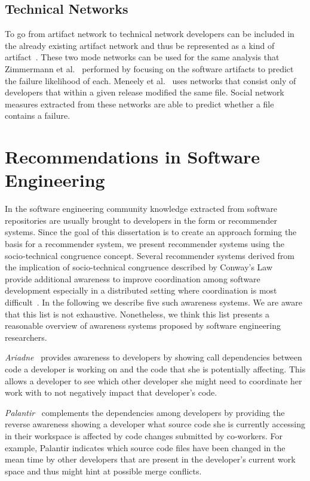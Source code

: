 \subsection{Technical Networks}
\label{chap:6:tn}
To go from artifact network to technical network developers can be included in the already existing artifact network and thus be represented as a kind of artifact~\cite{pinzger:fse:2008}.
These two mode networks can be used for the same analysis that Zimmermann et al.~\cite{zimmermann:esem:2009,zimmermann:icse:2008} performed by focusing on the software artifacts to predict the failure likelihood of each.
%
Meneely et al.~\cite{meneely:fse:2008} uses networks that consist only of developers that within a given release modified the same file.
Social network measures extracted from these networks are able to predict whether a file contains a failure.




\section{Recommendations in Software Engineering}
In the software engineering community knowledge extracted from software repositories are usually brought to developers in the form or recommender systems.
Since the goal of this dissertation is to create an approach forming the basis for a recommender system, we present recommender systems using the socio-technical congruence concept.
Several recommender systems derived from the implication of socio-technical congruence described by Conway's Law~\cite{conway:datamination:1968} provide additional awareness to improve coordination among software development especially in a distributed setting where coordination is most difficult~\cite{olson:hci:2000}.
In the following we describe five such awareness systems.
We are aware that this list is not exhaustive. 
Nonetheless, we think this list presents a reasonable overview of awareness systems proposed by software engineering researchers.

\emph{Ariadne}~\cite{trainer2005:ariadne} provides awareness to developers by showing call dependencies between code a developer is working on and the code that she is potentially affecting.
This allows a developer to see which other developer she might need to coordinate her work with to not negatively impact that developer's code.

\emph{Palantir}~\cite{sarma:cscw:2002} complements the dependencies among developers by providing the reverse awareness  showing a developer what source code she is currently accessing in their workspace is affected by code changes submitted by co-workers.
For example, Palantir indicates which source code files have been changed in the mean time by other developers that are present in the developer's current work space and thus might hint at possible merge conflicts.

